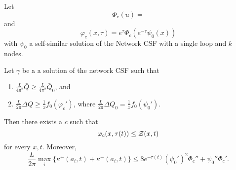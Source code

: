\documentclass[a4paper, 12pt]{amsart}
\begin{document}
\begin{thm}
\label{thm:comparison_function}
Let
\[
\Phi_c(u) = 
\]
and
\[
\varphi_c(x, \tau) = e^{\tau} \Phi_c(e^{-\tau} \psi_0(x))
\]
with $\psi_0$ a self-similar solution of the Network CSF with a single loop and $k$ nodes.

Let $\gamma$ be a a solution of the network CSF such that
\begin{enumerate}
\item $\frac{L}{4\pi^2} \bar{Q} \geq \frac{L}{4\pi^2} \bar{Q}_0$, and
\item $\frac{L}{2\pi} \Delta Q \geq \tfrac{1}{x} f_0(\varphi_c')$, where $\frac{L}{2\pi} \Delta Q_0 = \tfrac{1}{x} f_0(\psi_0')$.
\end{enumerate}
Then there exists a $c$ such that
\[
\varphi_c(x, \tau(t)) \leq \operatorname{\mathcal{Z}}(x, t)
\]
for every $x, t$. Moreover,
\[
\frac{L}{2\pi} \max_i \{\kappa^+(a_i, t) + \kappa^-(a_i, t)\} \leq 8 e^{-\tau(t)} (\psi_0')^2 \Phi_c'' + \psi_0'' \Phi_c'.
\]
\end{thm}
\end{document}
